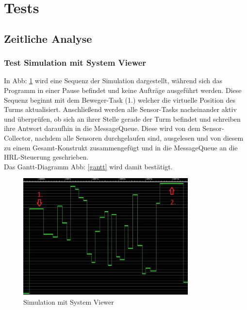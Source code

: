 \section{Tests}
\subsection{Zeitliche Analyse}
\subsubsection{Test Simulation mit System Viewer}
In Abb: \ref{fig4} wird eine Sequenz der Simulation dargestellt, während sich das Programm in einer Pause befindet und keine Aufträge ausgeführt werden. Diese Sequenz beginnt mit dem Beweger-Task (1.) welcher die virtuelle Position des Turms aktualisiert. Anschließend werden alle Sensor-Tasks nacheinander aktiv und überprüfen, ob sich an ihrer Stelle gerade der Turm befindet und schreiben ihre Antwort daraufhin in die MessageQueue. Diese wird von dem Sensor-Collector, nachdem alle Sensoren durchgelaufen sind, ausgelesen und von diesem zu einem Gesamt-Konstrukt zusammengefügt und in die MessageQueue an die HRL-Steuerung geschrieben. \\
Das Gantt-Diagramm  Abb: \ref{gantt} wird damit bestätigt.

\begin{figure}[H]
	\centering
  \includegraphics[width=0.8\textwidth]{diagrams/simulation_erklaerung.jpg}
	\caption{Simulation mit System Viewer}
	\label{fig4}
\end{figure}
